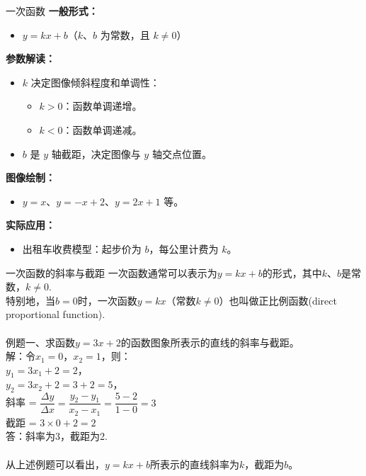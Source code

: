 \documentclass[aspectratio=169]{ctexbeamer} %
\begin{document}
\begin{frame}{一次函数}
    \textbf{一般形式：}
    \begin{itemize}
        \item \( y = kx + b \)（\( k \)、\( b \) 为常数，且 \( k \neq 0 \)）
    \end{itemize}

    \vspace{0.5cm}
    \textbf{参数解读：}
    \begin{itemize}
        \item \( k \) 决定图像倾斜程度和单调性：
        \begin{itemize}
            \item \( k > 0 \)：函数单调递增。
            \item \( k < 0 \)：函数单调递减。
        \end{itemize}
        \item \( b \) 是 \( y \) 轴截距，决定图像与 \( y \) 轴交点位置。
    \end{itemize}

    \vspace{0.5cm}
    \textbf{图像绘制：}
    \begin{itemize}
        \item \( y = x \)、\( y = -x + 2 \)、\( y = 2x + 1 \) 等。
    \end{itemize}

    \vspace{0.5cm}
    \textbf{实际应用：}
    \begin{itemize}
        \item 出租车收费模型：起步价为 \( b \)，每公里计费为 \( k \)。
    \end{itemize}
\end{frame}

\begin{frame}[t]{一次函数的斜率与截距}
一次函数通常可以表示为$y = kx + b$的形式，其中$k$、$b$是常数，$k \neq 0$. \\
特别地，当$b = 0$时，一次函数$y = kx$（常数$k \neq 0$）也叫做\alert{正比例函数(direct proportional function)}. \\
\\
例题一、求函数$y = 3x + 2$的函数图象所表示的直线的斜率与截距。\\
解：令$x_1 = 0$，$x_2 = 1$，则：\\
$y_1 = 3x_1 + 2 = 2$，\\
$y_2 = 3x_2 + 2 = 3 + 2 = 5$，\\
斜率 = $\dfrac{\Delta y}{\Delta x} = \dfrac{y_2 - y_1}{x_2 - x_1} = \dfrac{5 - 2}{1 - 0} = {3}$ \\
截距 = $3 \times 0 + 2 = 2$ \\
答：斜率为3，截距为2.\\
\\
从上述例题可以看出，$y = kx + b$所表示的直线斜率为$k$，截距为$b$。

\end{frame}
\end{document}
